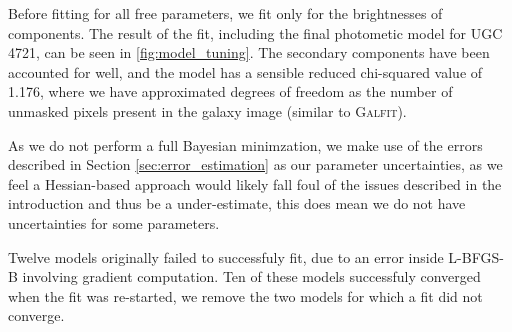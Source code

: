 \documentclass[../main.tex]{subfiles}
\begin{document}
Before fitting for all free parameters, we fit only for the brightnesses of components. The result of the fit, including the final photometic model for UGC 4721, can be seen in \ref{fig:model_tuning}. The secondary components have been accounted for well, and the model has a sensible reduced chi-squared value of 1.176, where we have approximated degrees of freedom as the number of unmasked pixels present in the galaxy image (similar to \textsc{Galfit}).

\begin{figure*}
  \caption{Effect of fitting on the aggregated models. The top left panel shows an Arcsinh-scaled image of the galaxy being fit (UGC 4721), the top middle shows the final model obtained (with the same limits and scaling as the galaxy image) and the top right shows the difference between the two images, in units of pixel uncertainty. The bottom panels show a simple representation of the model before and after tuning, overlaid on the galaxy image from the top-left panel.}
  \label{fig:model_tuning}
\end{figure*}

As we do not perform a full Bayesian minimzation, we make use of the errors described in Section \ref{sec:error_estimation} as our parameter uncertainties, as we feel a Hessian-based approach would likely fall foul of the issues described in the introduction and thus be a under-estimate, this does mean we do not have uncertainties for some parameters.

Twelve models originally failed to successfuly fit, due to an error inside L-BFGS-B involving gradient computation. Ten of these models successfuly converged when the fit was re-started, we remove the two models for which a fit did not converge.
\end{document}
